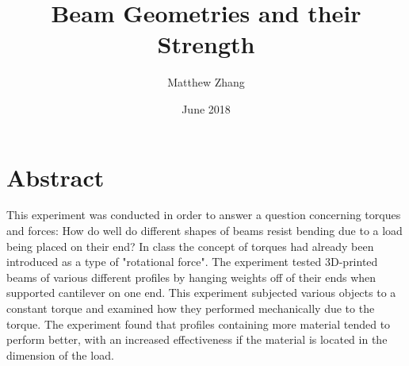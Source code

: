 \documentclass{article}
\title{Beam Geometries and their Strength}
\author{Matthew Zhang}
\date{June 2018}
\begin{document}
\maketitle


\section*{Abstract}
\quad 
This experiment was conducted in order to answer a question concerning torques and forces: How do well do different shapes of beams resist bending due to a load being placed on their end? In class the concept of torques had already been introduced as a type of "rotational force". The experiment tested 3D-printed beams of various different profiles by hanging weights off of their ends when supported cantilever on one end. This experiment subjected various objects to a constant torque and examined how they performed mechanically due to the torque. The experiment found that profiles containing more material tended to perform better, with an increased effectiveness if the material is located in the dimension of the load.
\end{document}
